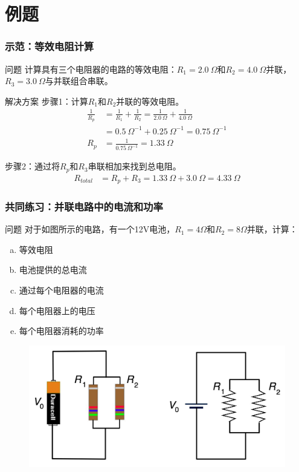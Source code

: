 \documentclass{beamer}
\begin{document}
\section{例题}
\begin{frame}
    \frametitle{示范：等效电阻计算}
    \begin{block}{问题}
        计算具有三个电阻器的电路的等效电阻：$R_1 = 2.0~\Omega$和$R_2 = 4.0~\Omega$并联，$R_3 = 3.0~\Omega$与并联组合串联。
    \end{block}
    \begin{block}{解决方案}
        步骤1：计算$R_1$和$R_2$并联的等效电阻。
        \begin{align*}
            \frac{1}{R_p} &= \frac{1}{R_1} + \frac{1}{R_2} = \frac{1}{2.0~\Omega} + \frac{1}{4.0~\Omega}\\
            &= 0.5~\Omega^{-1} + 0.25~\Omega^{-1} = 0.75~\Omega^{-1}\\
            R_p &= \frac{1}{0.75~\Omega^{-1}} = 1.33~\Omega
        \end{align*}
        
        步骤2：通过将$R_p$和$R_3$串联相加来找到总电阻。
        \begin{align*}
            R_{total} &= R_p + R_3 = 1.33~\Omega + 3.0~\Omega = 4.33~\Omega
        \end{align*}
    \end{block}
\end{frame}

\begin{frame}
    \frametitle{共同练习：并联电路中的电流和功率}
    \begin{block}{问题}
        对于如图所示的电路，有一个12V电池，$R_1 = 4\Omega$和$R_2 = 8\Omega$并联，计算：
        \begin{enumerate}[(a)]
            \item 等效电阻
            \item 电池提供的总电流
            \item 通过每个电阻器的电流
            \item 每个电阻器上的电压
            \item 每个电阻器消耗的功率
        \end{enumerate}
    \end{block}
    \begin{figure}
        \centering
        \includegraphics[width=0.5\linewidth]{ParallelCircuitbat.jpg}
    \end{figure}
\end{frame}
\end{document}
